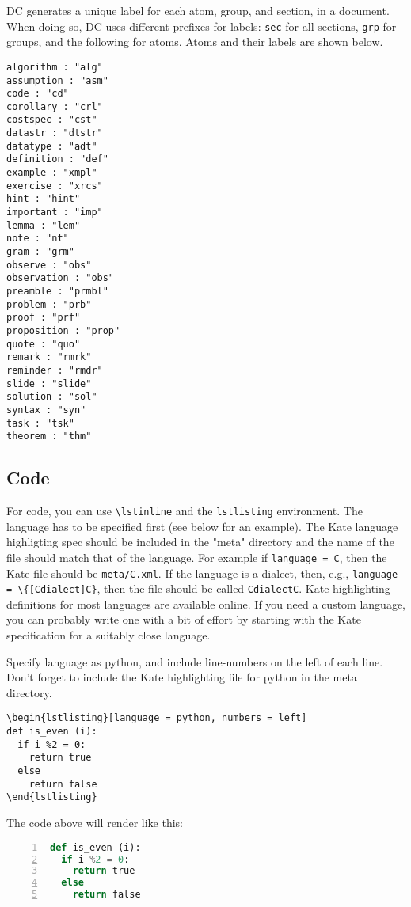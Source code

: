 DC generates a unique label for each atom, group, and section, in a document.
%
When doing so, DC uses different prefixes for labels: \lstinline`sec` for all sections, \lstinline`grp` for groups, and the following for atoms.   Atoms and their labels are shown below.
%
\begin{lstlisting}
algorithm : "alg"
assumption : "asm"
code : "cd"
corollary : "crl"
costspec : "cst"
datastr : "dtstr"
datatype : "adt"
definition : "def"
example : "xmpl"
exercise : "xrcs"
hint : "hint"
important : "imp"
lemma : "lem"
note : "nt"
gram : "grm"
observe : "obs"
observation : "obs"
preamble : "prmbl"
problem : "prb"
proof : "prf"
proposition : "prop"
quote : "quo"
remark : "rmrk"
reminder : "rmdr"
slide : "slide"
solution : "sol"
syntax : "syn"
task : "tsk"
theorem : "thm"
\end{lstlisting}

\subsection{Code}
\label{sec:mtl::code}
For code, you can use \lstinline`\lstinline` and the \lstinline`lstlisting` environment.  The language has to be specified first (see below for an example).  The Kate language highligting spec should be included in the "meta" directory and the name of the file should match that of the language.  For example if \lstinline`language = C`, then the Kate file should be \lstinline`meta/C.xml`.  If the language is a dialect, then, e.g., \lstinline`language = \{[Cdialect]C}`, then the file should be called \lstinline`CdialectC`.  
%
Kate highlighting definitions for most languages are available online.
%
If you need a custom language, you can probably write one with a bit of effort by starting with the Kate specification for a  suitably close language.

\begin{flex}
\begin{example}
Specify language as python, and include  line-numbers on the left of each line.
Don't forget to include the Kate highlighting file for python in the meta directory.

\begin{verbatim}
\begin{lstlisting}[language = python, numbers = left]
def is_even (i):
  if i %2 = 0:
    return true
  else 
    return false
\end{lstlisting}
\end{verbatim}
\end{example}

The code above will render like this:
%
\begin{lstlisting}[language = python, numbers = left]
def is_even (i):
  if i %2 = 0:
    return true
  else 
    return false
\end{lstlisting}
\end{flex}


